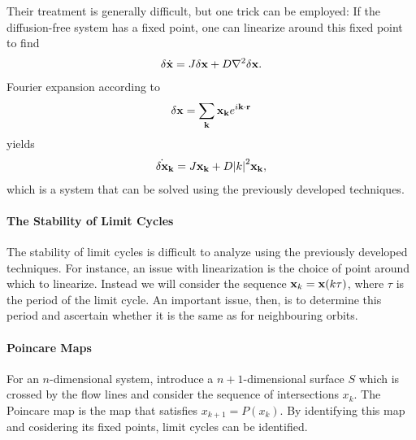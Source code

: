 Their treatment is generally difficult, but one trick can be employed: If the diffusion-free system has a fixed point, one can linearize around this fixed point to find
\begin{align*}
	\delta\dot{\vb{x}} = J\delta\vb{x} + D\laplacian{\delta\vb{x}}.
\end{align*}
Fourier expansion according to
\begin{align*}
	\delta\vb{x} = \sum\limits_{\vb{k}}\vb{x}_{\vb{k}}e^{i\vb{k}\cdot\vb{r}}
\end{align*}
yields
\begin{align*}
	\dot{\delta\vb{x}}_{\vb{k}} = J\vb{x}_{\vb{k}} + D\abs{k}^{2}\vb{x}_{\vb{k}},
\end{align*}
which is a system that can be solved using the previously developed techniques.

\paragraph{The Stability of Limit Cycles}
The stability of limit cycles is difficult to analyze using the previously developed techniques. For instance, an issue with linearization is the choice of point around which to linearize. Instead we will consider the sequence $\vb{x}_{k} = \vb{x}(k\tau)$, where $\tau$ is the period of the limit cycle. An important issue, then, is to determine this period and ascertain whether it is the same as for neighbouring orbits.

\paragraph{Poincare Maps}
For an $n$-dimensional system, introduce a $n + 1$-dimensional surface $S$ which is crossed by the flow lines and consider the sequence of intersections $x_{k}$. The Poincare map is the map that satisfies $x_{k + 1} = P(x_{k})$. By identifying this map and cosidering its fixed points, limit cycles can be identified.